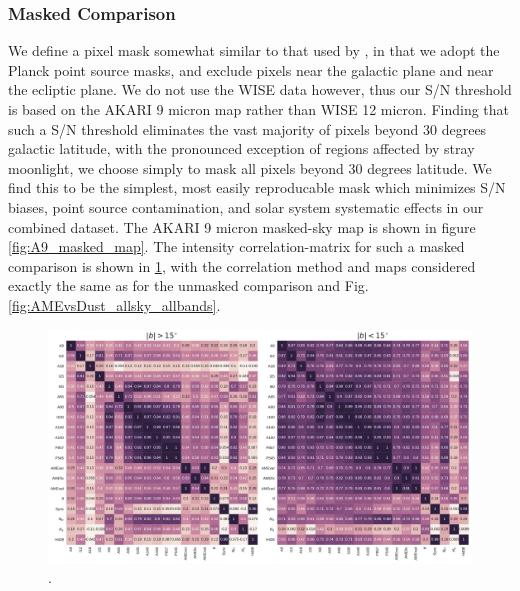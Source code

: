     \subsubsection{Masked Comparison}
        We define a pixel mask somewhat similar to that used by \cite{hensley16}, in that we adopt the Planck point source masks, and exclude pixels near the galactic plane and near the ecliptic plane. We do not use the WISE data however, thus our S/N threshold is based on the AKARI 9 micron map rather than WISE 12 micron. Finding that such a S/N threshold eliminates the vast majority of pixels beyond 30 degrees galactic latitude, with the pronounced exception of regions affected by stray moonlight, we choose simply to mask all pixels beyond 30 degrees latitude. We find this to be the simplest, most easily reproducable mask which minimizes S/N biases, point source contamination, and solar system systematic effects in our combined dataset. The AKARI 9 micron masked-sky map is shown in figure \ref{fig:A9_masked_map}. The intensity correlation-matrix for such a masked comparison is shown in \ref{fig:all_bands_corr_matrix_wAME_spearmanintensity_maskall}, with the correlation method and maps considered exactly the same as for the unmasked comparison and Fig. \ref{fig:AMEvsDust_allsky_allbands}.
        \begin{figure}
          \includegraphics[width=\textwidth]{../Plots/ch_allsky/all_bands_corr_matrix_wAME_spearmanintensity_maskall.pdf}
          \centering
          \caption{.}
          \label{fig:all_bands_corr_matrix_wAME_spearmanintensity_maskall}
        \end{figure}

